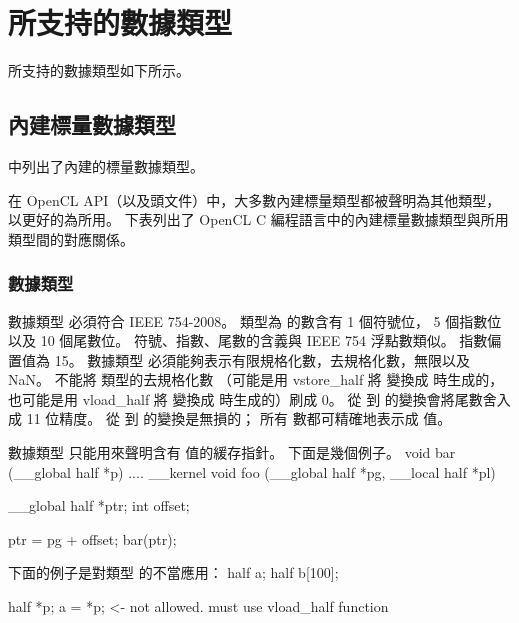 \section{所支持的數據類型}

所支持的數據類型如下所示。

\subsection[sec:bisdt]{內建標量數據類型}

中列出了內建的標量數據類型。


在 OpenCL API（以及頭文件）中，大多數內建標量類型都被聲明為其他類型，
以更好的為所用。
下表列出了 OpenCL C 編程語言中的內建標量數據類型與所用類型間的對應關係。



\subsubsection{數據類型 }

數據類型  必須符合 IEEE 754-2008。
類型為  的數含有 1 個符號位， 5 個指數位以及 10 個尾數位。
符號、指數、尾數的含義與 IEEE 754 浮點數類似。
指數偏置值為 15。
數據類型  必須能夠表示有限規格化數，去規格化數，無限以及 NaN。
不能將  類型的去規格化數
（可能是用 vstore_half 將  變換成  時生成的，
也可能是用 vload_half 將  變換成  時生成的）刷成 0。
從  到  的變換會將尾數舍入成 11 位精度。
從   到  的變換是無損的；
所有  數都可精確地表示成  值。

數據類型  只能用來聲明含有  值的緩存指針。
下面是幾個例子。
\startclc
void bar (__global half *p)
{
	....
}
__kernel void foo (__global half *pg, __local half *pl)
{
	__global half *ptr;
	int offset;

	ptr = pg + offset;
	bar(ptr);
}
\stopclc

下面的例子是對類型  的不當應用：
\startclc
half a;
half b[100];

half *p;
a = *p;		<- not allowed. must use vload_half function
\stopclc

